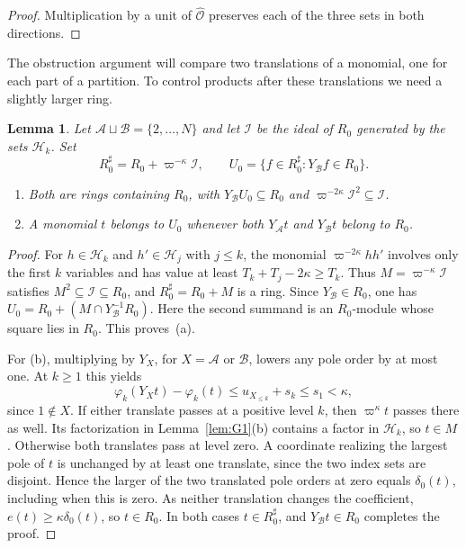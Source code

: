 \documentclass[11pt, letterpaper]{article}
\newtheorem{lemma}[theorem]{Lemma}
\theoremstyle{definition}
\theoremstyle{remark}
\begin{document}
\begin{proof}
    Multiplication by a unit of $\widehat{\mathcal{O}}$ preserves each of the three sets in both directions.
\end{proof}

The obstruction argument will compare two translations of a monomial, one for each part of a partition.
To control products after these translations we need a slightly larger ring.

\begin{lemma}
    \label{lem:G3}
    Let $\mathcal{A} \sqcup \mathcal{B} = \{2, \ldots, N\}$ and let $\mathcal{I}$ be the ideal of $R_{0}$ generated by the sets $\mathcal{H}_{k}$.
    Set
    \[
        R_{0}^{\sharp} = R_{0} + \varpi^{-\kappa}\mathcal{I},
        \qquad U_{0} = \{f \in R_{0}^{\sharp} : Y_{\mathcal{B}}f \in R_{0}\}.
    \]
    \begin{enumerate}
        \item[\textup{(a)}] Both are rings containing $R_{0}$, with $Y_{\mathcal{B}}U_{0} \subseteq R_{0}$ and $\varpi^{-2\kappa}\mathcal{I}^{2} \subseteq \mathcal{I}$.
        \item[\textup{(b)}] A monomial $t$ belongs to $U_{0}$ whenever both $Y_{\mathcal{A}}t$ and $Y_{\mathcal{B}}t$ belong to $R_{0}$.
    \end{enumerate}
\end{lemma}

\begin{proof}
    For $h \in \mathcal{H}_{k}$ and $h' \in \mathcal{H}_{j}$ with $j \le k$, the monomial $\varpi^{-2\kappa}hh'$ involves only the first $k$ variables and has value at least $T_{k} + T_{j} - 2\kappa \ge T_{k}$.
    Thus $M = \varpi^{-\kappa}\mathcal{I}$ satisfies $M^{2} \subseteq \mathcal{I} \subseteq R_{0}$, and $R_{0}^{\sharp} = R_{0} + M$ is a ring.
    Since $Y_{\mathcal{B}} \in R_{0}$, one has $U_{0} = R_{0} + (M \cap Y_{\mathcal{B}}^{-1}R_{0})$.
    Here the second summand is an $R_{0}$-module whose square lies in $R_{0}$.
    This proves~(a).

    For (b), multiplying by $Y_{X}$, for $X = \mathcal{A}$ or $\mathcal{B}$, lowers any pole order by at most one.
    At $k \ge 1$ this yields
    \[
        \varphi_{k}(Y_{X}t) - \varphi_{k}(t)
        \le u_{X_{\le k}} + s_{k} \le s_{1} < \kappa,
    \]
    since $1 \notin X$.
    If either translate passes at a positive level $k$, then $\varpi^{\kappa}t$ passes there as well.
    Its factorization in Lemma~\ref{lem:G1}(b) contains a factor in $\mathcal{H}_{k}$, so $t \in M$.
    Otherwise both translates pass at level zero.
    A coordinate realizing the largest pole of $t$ is unchanged by at least one translate, since the two index sets are disjoint.
    Hence the larger of the two translated pole orders at zero equals $\delta_{0}(t)$, including when this is zero.
    As neither translation changes the coefficient, $e(t) \ge \kappa\delta_{0}(t)$, so $t \in R_{0}$.
    In both cases $t \in R_{0}^{\sharp}$, and $Y_{\mathcal{B}}t \in R_{0}$ completes the proof.
\end{proof}
\end{document}
